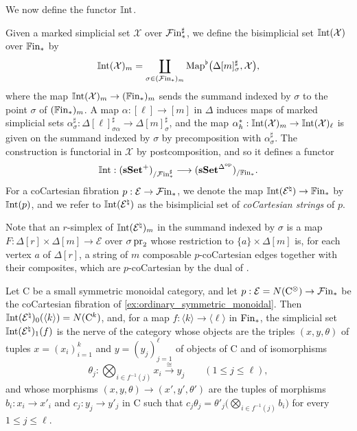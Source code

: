 \documentclass[10pt,reqno]{amsart}
\begin{document}
We now define the functor $\mathbb{I}\mathrm{nt}$.

\begin{construction}
\label{const:cocartesian_strings}
Given a marked simplicial set $\mathcal X$ over $\mathcal{F}\mathrm{in}_*^\sharp$,
we define the bisimplicial set $\mathbb{I}\mathrm{nt}(\mathcal X)$ over $\mathbb{F}\mathrm{in}_*$
by
\[
\mathbb{I}\mathrm{nt}(\mathcal X)_m=
\coprod_{\sigma\in (\mathcal{F}\mathrm{in}_*)_m}
\operatorname{Map}^\flat
\bigl(\Delta[m]^\sharp_\sigma,\mathcal X\bigr),
\]
where the map $\mathbb{I}\mathrm{nt}(\mathcal X)_m\to(\mathbb{F}\mathrm{in}_*)_m$ sends the summand
indexed by $\sigma$ to the point $\sigma$ of $(\mathbb{F}\mathrm{in}_*)_m$. A
map $\alpha:[\ell]\to[m]$ in $\Delta$ induces maps of marked
simplicial sets
$\alpha^\sharp_\sigma:\Delta[\ell]^\sharp_{\sigma\alpha}\to
\Delta[m]^\sharp_\sigma$, and the map
$\alpha_h^*:\mathbb{I}\mathrm{nt}(\mathcal X)_m\to\mathbb{I}\mathrm{nt}(\mathcal X)_\ell$ is given on
the summand indexed by $\sigma$ by precomposition with
$\alpha^\sharp_\sigma$. The construction is functorial in
$\mathcal X$ by postcomposition, and so it defines a functor
\[
 \mathbb{I}\mathrm{nt}:(\mathbf{sSet}^+)_{/\mathcal{F}\mathrm{in}_*^\sharp}
   \longrightarrow (\mathbf{sSet}^{\Delta^{\mathrm{op}}})_{/\mathbb{F}\mathrm{in}_*}.
\]
For a coCartesian fibration $p:\mathcal E\to \mathcal{F}\mathrm{in}_*$, we denote the
map $\mathbb{I}\mathrm{nt}(\mathcal E^\natural)\to\mathbb{F}\mathrm{in}_*$ by $\mathbb{I}\mathrm{nt}(p)$, and we
refer to $\mathbb{I}\mathrm{nt}(\mathcal E^\natural)$ as the bisimplicial set of
\emph{coCartesian strings} of $p$.
\end{construction}

Note that an $r$-simplex of $\mathbb{I}\mathrm{nt}(\mathcal E^\natural)_m$ in the
summand indexed by $\sigma$ is a map
$F:\Delta[r]\times\Delta[m]\to\mathcal E$ over $\sigma\operatorname{pr}_2$ whose
restriction to $\{a\}\times\Delta[m]$ is, for each vertex $a$ of
$\Delta[r]$, a string of $m$ composable $p$-coCartesian edges
together with their composites, which are $p$-coCartesian by the
dual of \cite[Proposition~2.4.1.7]{lurie2009higher}.

\begin{ex}
\label{ex:monoidal_category_strings}
Let $\mathrm C$ be a small symmetric monoidal category, and let
$p:\mathcal E=N(\mathrm C^\otimes)\to\mathcal{F}\mathrm{in}_*$ be the coCartesian
fibration of \cref{ex:ordinary_symmetric_monoidal}. Then
$\mathbb{I}\mathrm{nt}(\mathcal E^\natural)_0(\langle k\rangle)=N(\mathrm C^k)$, and,
for a map $f:\langle k\rangle\to\langle\ell\rangle$ in $\mathrm{Fin}_*$, the
simplicial set $\mathbb{I}\mathrm{nt}(\mathcal E^\natural)_1(f)$ is the nerve of the
category whose objects are the triples $(x,y,\theta)$ of tuples
$x=(x_i)_{i=1}^k$ and $y=(y_j)_{j=1}^\ell$ of objects of
$\mathrm C$ and of isomorphisms
\[
 \theta_j:\bigotimes_{i\in f^{-1}(j)}x_i\xrightarrow{\cong} y_j
 \qquad(1\leq j\leq\ell),
\]
and whose morphisms $(x,y,\theta)\to(x',y',\theta')$ are the tuples
of morphisms $b_i:x_i\to x'_i$ and $c_j:y_j\to y'_j$ in
$\mathrm C$ such that
$c_j\theta_j=\theta'_j\bigl(\bigotimes_{i\in f^{-1}(j)}b_i\bigr)$
for every $1\leq j\leq\ell$.
\end{ex}
\end{document}

